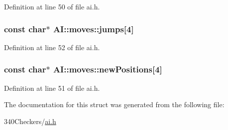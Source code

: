 Definition at line 50 of file ai.\-h.

\hypertarget{struct_a_i_1_1moves_a243ff8ab759ff66204e2d2152851fa65}{
\subsubsection[{jumps}]{\setlength{\rightskip}{0pt plus 5cm}const char$\ast$ A\-I\-::moves\-::jumps\mbox{[}4\mbox{]}}}\label{struct_a_i_1_1moves_a243ff8ab759ff66204e2d2152851fa65}


Definition at line 52 of file ai.\-h.

\hypertarget{struct_a_i_1_1moves_a1a70af16b28de0cb7d83c07b6663c647}{
\subsubsection[{new\-Positions}]{\setlength{\rightskip}{0pt plus 5cm}const char$\ast$ A\-I\-::moves\-::new\-Positions\mbox{[}4\mbox{]}}}\label{struct_a_i_1_1moves_a1a70af16b28de0cb7d83c07b6663c647}


Definition at line 51 of file ai.\-h.



The documentation for this struct was generated from the following file\-:\begin{DoxyCompactItemize}
\item 
340\-Checkers/\hyperlink{ai_8h}{ai.\-h}\end{DoxyCompactItemize}
